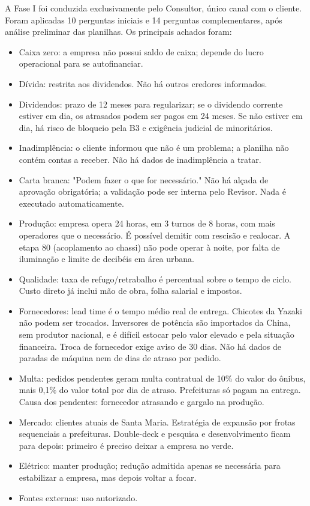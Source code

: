 \documentclass[12pt,a4paper,oneside,brazil]{abntex2}
\begin{document}
A Fase I foi conduzida exclusivamente pelo Consultor, único canal com o cliente. Foram aplicadas 10 perguntas iniciais e 14 perguntas complementares, após análise preliminar das planilhas. Os principais achados foram:

\begin{itemize}
\item Caixa zero: a empresa não possui saldo de caixa; depende do lucro operacional para se autofinanciar.
\item Dívida: restrita aos dividendos. Não há outros credores informados.
\item Dividendos: prazo de 12 meses para regularizar; se o dividendo corrente estiver em dia, os atrasados podem ser pagos em 24 meses. Se não estiver em dia, há risco de bloqueio pela B3 e exigência judicial de minoritários.
\item Inadimplência: o cliente informou que não é um problema; a planilha não contém contas a receber. Não há dados de inadimplência a tratar.
\item Carta branca: "Podem fazer o que for necessário." Não há alçada de aprovação obrigatória; a validação pode ser interna pelo Revisor. Nada é executado automaticamente.
\item Produção: empresa opera 24 horas, em 3 turnos de 8 horas, com mais operadores que o necessário. É possível demitir com rescisão e realocar. A etapa 80 (acoplamento ao chassi) não pode operar à noite, por falta de iluminação e limite de decibéis em área urbana.
\item Qualidade: taxa de refugo/retrabalho é percentual sobre o tempo de ciclo. Custo direto já inclui mão de obra, folha salarial e impostos.
\item Fornecedores: lead time é o tempo médio real de entrega. Chicotes da Yazaki não podem ser trocados. Inversores de potência são importados da China, sem produtor nacional, e é difícil estocar pelo valor elevado e pela situação financeira. Troca de fornecedor exige aviso de 30 dias. Não há dados de paradas de máquina nem de dias de atraso por pedido.
\item Multa: pedidos pendentes geram multa contratual de 10\% do valor do ônibus, mais 0,1\% do valor total por dia de atraso. Prefeituras só pagam na entrega. Causa dos pendentes: fornecedor atrasando e gargalo na produção.
\item Mercado: clientes atuais de Santa Maria. Estratégia de expansão por frotas sequenciais a prefeituras. Double-deck e pesquisa e desenvolvimento ficam para depois: primeiro é preciso deixar a empresa no verde.
\item Elétrico: manter produção; redução admitida apenas se necessária para estabilizar a empresa, mas depois voltar a focar.
\item Fontes externas: uso autorizado.
\end{itemize}
\end{document}
